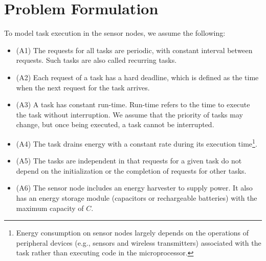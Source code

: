 \section{ Problem Formulation} \label{sec:problem}

To model task execution in the sensor nodes, we assume the following: 
\begin{itemize}
	\item (A1) The requests for all tasks are periodic, with constant interval between requests. Such tasks are also called recurring tasks. 
	\item (A2) Each request of a task has a hard deadline, which is defined as the time when the next request for the task arrives. 
	\item (A3) A task has constant run-time. Run-time refers to the time to execute the task without interruption. We assume that the priority of tasks may change, but once being executed, a task cannot be interrupted. 
	\item (A4) The task drains energy with a constant rate during its execution time\footnote{Energy consumption on sensor nodes largely depends on the operations of peripheral devices (e.g., sensors and wireless transmitters) associated with the task rather than executing code in the microprocessor.}.       
	\item (A5) The tasks are independent in that requests for a given task do not depend on the initialization or the completion of requests for other tasks.
	\item (A6) The sensor node includes an energy harvester to supply power. It also has an energy storage module (capacitors or rechargeable batteries) with the maximum capacity of $C$. 
\end{itemize}

 
